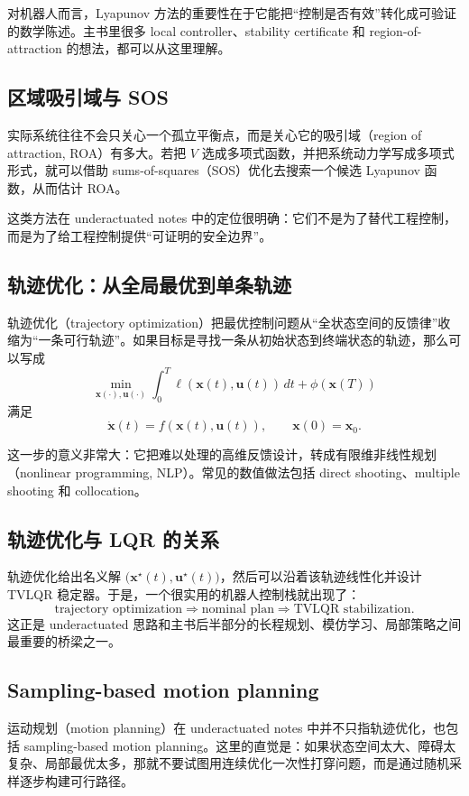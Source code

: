 \documentclass[a4paper]{article}
\newcommand{\bx}{\mathbf{x}}
\newcommand{\bu}{\mathbf{u}}
\begin{document}
对机器人而言，Lyapunov 方法的重要性在于它能把“控制是否有效”转化成可验证的数学陈述。主书里很多 local controller、stability certificate 和 region-of-attraction 的想法，都可以从这里理解。

\subsection{区域吸引域与 SOS}

实际系统往往不会只关心一个孤立平衡点，而是关心它的吸引域（region of attraction, ROA）有多大。若把 $V$ 选成多项式函数，并把系统动力学写成多项式形式，就可以借助 sums-of-squares（SOS）优化去搜索一个候选 Lyapunov 函数，从而估计 ROA。

这类方法在 underactuated notes 中的定位很明确：它们不是为了替代工程控制，而是为了给工程控制提供“可证明的安全边界”。

\subsection{轨迹优化：从全局最优到单条轨迹}

轨迹优化（trajectory optimization）把最优控制问题从“全状态空间的反馈律”收缩为“一条可行轨迹”。如果目标是寻找一条从初始状态到终端状态的轨迹，那么可以写成
\[
\min_{\bx(\cdot),\bu(\cdot)} \int_0^T \ell(\bx(t),\bu(t))\,dt + \phi(\bx(T))
\]
满足
\[
\dot{\bx}(t) = f(\bx(t),\bu(t)),\qquad \bx(0)=\bx_0.
\]

这一步的意义非常大：它把难以处理的高维反馈设计，转成有限维非线性规划（nonlinear programming, NLP）。常见的数值做法包括 direct shooting、multiple shooting 和 collocation。

\subsection{轨迹优化与 LQR 的关系}

轨迹优化给出名义解 $\big(\bx^\star(t),\bu^\star(t)\big)$，然后可以沿着该轨迹线性化并设计 TVLQR 稳定器。于是，一个很实用的机器人控制栈就出现了：
\[
\text{trajectory optimization} \Rightarrow \text{nominal plan} \Rightarrow \text{TVLQR stabilization}.
\]
这正是 underactuated 思路和主书后半部分的长程规划、模仿学习、局部策略之间最重要的桥梁之一。

\subsection{Sampling-based motion planning}

运动规划（motion planning）在 underactuated notes 中并不只指轨迹优化，也包括 sampling-based motion planning。这里的直觉是：如果状态空间太大、障碍太复杂、局部最优太多，那就不要试图用连续优化一次性打穿问题，而是通过随机采样逐步构建可行路径。
\end{document}
